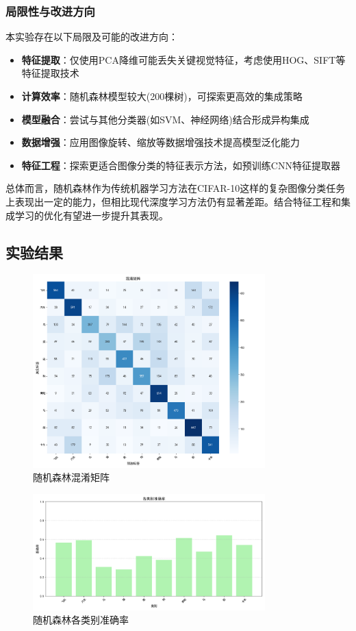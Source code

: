\documentclass[UTF8]{report}
\theoremstyle{MyLineTheoremStyle} %
\theoremstyle{MyBlockTheoremStyle} %
\theoremstyle{MySubsubsectionStyle} %
\begin{document}
\subsubsection{局限性与改进方向}
本实验存在以下局限及可能的改进方向：
\begin{itemize}
    \item \textbf{特征提取}：仅使用PCA降维可能丢失关键视觉特征，考虑使用HOG、SIFT等特征提取技术
    \item \textbf{计算效率}：随机森林模型较大(200棵树)，可探索更高效的集成策略
    \item \textbf{模型融合}：尝试与其他分类器(如SVM、神经网络)结合形成异构集成
    \item \textbf{数据增强}：应用图像旋转、缩放等数据增强技术提高模型泛化能力
    \item \textbf{特征工程}：探索更适合图像分类的特征表示方法，如预训练CNN特征提取器
\end{itemize}

总体而言，随机森林作为传统机器学习方法在CIFAR-10这样的复杂图像分类任务上表现出一定的能力，但相比现代深度学习方法仍有显著差距。结合特征工程和集成学习的优化有望进一步提升其表现。

\subsection{实验结果}

\begin{figure}[H]
    \centering
    \includegraphics[width=0.8\textwidth]{rf_cm.png}
    \caption{随机森林混淆矩阵}
    \label{fig:rf_confusion_matrix}
\end{figure}

\begin{figure}[H]
    \centering
    \includegraphics[width=0.8\textwidth]{rf_acc.png}
    \caption{随机森林各类别准确率}
    \label{fig:rf_class_accuracy}
\end{figure}
\end{document}
